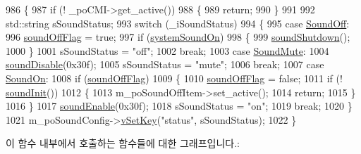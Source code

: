 \begin{DoxyCode}
986 \{
987   \textcolor{keywordflow}{if} (! \_poCMI->get\_active())
988   \{
989     \textcolor{keywordflow}{return};
990   \}
991 
992   std::string sSoundStatus;
993   \textcolor{keywordflow}{switch} (\_iSoundStatus)
994   \{
995   \textcolor{keywordflow}{case} \mbox{\hyperlink{class_v_b_a_1_1_window_a0d5c8ea46df2e5d53537db8aa5ecc175a66f39df2434885c0cf719b9fe49d0cef}{SoundOff}}:
996     \mbox{\hyperlink{gb_sound_8cpp_a2ff51b8fba1a4efea2d3d72f93210375}{soundOffFlag}} = \textcolor{keyword}{true};
997     \textcolor{keywordflow}{if} (\mbox{\hyperlink{system_8cpp_a3530cb4502bfecb40d4720c1bd4d83f0}{systemSoundOn}})
998     \{
999       \mbox{\hyperlink{gb_sound_8cpp_a2f94fcc352d566069ad4cee1e9a62a39}{soundShutdown}}();
1000     \}
1001     sSoundStatus = \textcolor{stringliteral}{"off"};
1002     \textcolor{keywordflow}{break};
1003   \textcolor{keywordflow}{case} \mbox{\hyperlink{class_v_b_a_1_1_window_a0d5c8ea46df2e5d53537db8aa5ecc175a6137309896b38578612c235600285276}{SoundMute}}:
1004     \mbox{\hyperlink{_sound_8cpp_ac659f56970310e671066599c629618b5}{soundDisable}}(0x30f);
1005     sSoundStatus = \textcolor{stringliteral}{"mute"};
1006     \textcolor{keywordflow}{break};
1007   \textcolor{keywordflow}{case} \mbox{\hyperlink{class_v_b_a_1_1_window_a0d5c8ea46df2e5d53537db8aa5ecc175aa7efffeefb07fe04c5ad1f882b3d4f81}{SoundOn}}:
1008     \textcolor{keywordflow}{if} (\mbox{\hyperlink{gb_sound_8cpp_a2ff51b8fba1a4efea2d3d72f93210375}{soundOffFlag}})
1009     \{
1010       \mbox{\hyperlink{gb_sound_8cpp_a2ff51b8fba1a4efea2d3d72f93210375}{soundOffFlag}} = \textcolor{keyword}{false};
1011       \textcolor{keywordflow}{if} (! \mbox{\hyperlink{gb_sound_8cpp_a48aac7ccc2439587be697d3f15fcd2e7}{soundInit}}())
1012       \{
1013         m\_poSoundOffItem->set\_active();
1014         \textcolor{keywordflow}{return};
1015       \}
1016     \}
1017     \mbox{\hyperlink{_sound_8cpp_aa3562ee185ac50bb560c6a034475bd18}{soundEnable}}(0x30f);
1018     sSoundStatus = \textcolor{stringliteral}{"on"};
1019     \textcolor{keywordflow}{break};
1020   \}
1021   m\_poSoundConfig->\mbox{\hyperlink{class_v_b_a_1_1_config_1_1_section_a57e1b95cbea40db71c093381beff4b0e}{vSetKey}}(\textcolor{stringliteral}{"status"}, sSoundStatus);
1022 \}
\end{DoxyCode}
이 함수 내부에서 호출하는 함수들에 대한 그래프입니다.\+:
\nopagebreak
